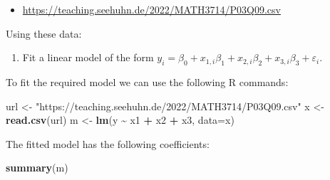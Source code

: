 \documentclass[
  a4paper,
]{article}
\newenvironment{Shaded}{\begin{snugshade}}{\end{snugshade}}
\newcommand{\AttributeTok}[1]{\textcolor[rgb]{0.13,0.29,0.53}{#1}}
\newcommand{\FunctionTok}[1]{\textcolor[rgb]{0.13,0.29,0.53}{\textbf{#1}}}
\newcommand{\NormalTok}[1]{#1}
\newcommand{\OtherTok}[1]{\textcolor[rgb]{0.56,0.35,0.01}{#1}}
\newcommand{\SpecialCharTok}[1]{\textcolor[rgb]{0.81,0.36,0.00}{\textbf{#1}}}
\newcommand{\StringTok}[1]{\textcolor[rgb]{0.31,0.60,0.02}{#1}}
\providecommand{\tightlist}{%
  \setlength{\itemsep}{0pt}\setlength{\parskip}{0pt}}
\theoremstyle{definition}
\theoremstyle{definition}
\theoremstyle{definition}
\theoremstyle{definition}
\theoremstyle{remark}
\begin{document}
\begin{itemize}
\tightlist
\item
  \url{https://teaching.seehuhn.de/2022/MATH3714/P03Q09.csv}
\end{itemize}

Using these data:

\begin{enumerate}
\def\labelenumi{\alph{enumi}.}
\tightlist
\item
  Fit a linear model of the form
  \(y_i = \beta_0 + x_{1,i} \beta_1 + x_{2,i} \beta_2 + x_{3,i} \beta_3 + \varepsilon_i\).
\end{enumerate}

\begin{myanswers}

To fit the required model we can use the following R commands:

\begin{Shaded}
\begin{Highlighting}[]
\NormalTok{url }\OtherTok{\textless{}{-}} \StringTok{"https://teaching.seehuhn.de/2022/MATH3714/P03Q09.csv"}
\NormalTok{x }\OtherTok{\textless{}{-}} \FunctionTok{read.csv}\NormalTok{(url)}
\NormalTok{m }\OtherTok{\textless{}{-}} \FunctionTok{lm}\NormalTok{(y }\SpecialCharTok{\textasciitilde{}}\NormalTok{ x1 }\SpecialCharTok{+}\NormalTok{ x2 }\SpecialCharTok{+}\NormalTok{ x3, }\AttributeTok{data=}\NormalTok{x)}
\end{Highlighting}
\end{Shaded}

The fitted model has the following coefficients:

\begin{Shaded}
\begin{Highlighting}[]
\FunctionTok{summary}\NormalTok{(m)}
\end{Highlighting}
\end{Shaded}


\end{myanswers}
\end{document}
